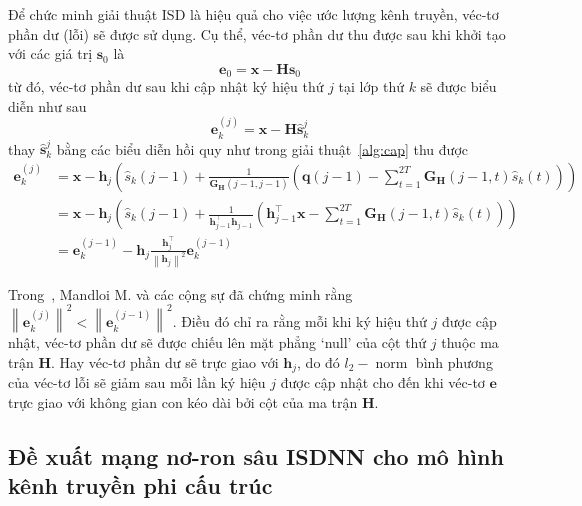 Để chức minh giải thuật ISD là hiệu quả cho việc ước lượng kênh truyền, véc-tơ phần dư (lỗi) sẽ được sử dụng. Cụ thể, véc-tơ phần dư thu được sau khi khởi tạo với các giá trị $\mathbf{s}_0$ là
\begin{equation}
    \mathbf{e}_0 = \mathbf{x} - \mathbf{H} \mathbf{s}_0
\end{equation}
từ đó, véc-tơ phần dư sau khi cập nhật ký hiệu thứ $j$ tại lớp thứ $k$ sẽ được biểu diễn như sau
\begin{equation}
    \mathbf{e}_k^{(j)}=\mathbf{x}-\mathbf{H} \hat{\mathbf{s}}_k^j
\end{equation}
thay $\hat{\mathbf{s}}_k^j$ bằng các biểu diễn hồi quy như trong giải thuật~\ref{alg:cap} thu được
\begin{equation}
\label{eq:eupdate}
\begin{aligned}
    \mathbf{e}_k^{(j)} & =\mathbf{x}-\mathbf{h}_j\left(\hat{s}_k(j-1)+\frac{1}{\mathbf{G}_\mathbf{H}(j-1, j-1)}\left(\mathbf{q}(j-1)-\sum_{t=1}^{2T} \mathbf{G}_\mathbf{H}(j-1, t) \hat{s}_k(t)\right)\right) \\
    & =\mathbf{x}-\mathbf{h}_j\left(\hat{s}_k(j-1)+\frac{1}{\mathbf{h}^\top_{j-1} \mathbf{h}_{j-1}}\left(\mathbf{h}_{j-1}^\top \mathbf{x}-\sum_{t=1}^{2T} \mathbf{G}_\mathbf{H}(j-1, t) \hat{s}_k(t)\right)\right) \\
    & =\mathbf{e}_k^{(j-1)}-\mathbf{h}_{j} \frac{\mathbf{h}_j^\top}{\left\|\mathbf{h}_j\right\|^2} \mathbf{e}_k^{(j-1)}
    \end{aligned}
\end{equation}

Trong~\cite{Mandloi2017}, Mandloi M. và các cộng sự đã chứng minh rằng $\left\|\mathbf{e}_k^{(j)}\right\|^2<\left\|\mathbf{e}_k^{(j-1)}\right\|^2$. Điều đó chỉ ra rằng mỗi khi ký hiệu thứ $j$ được cập nhật, véc-tơ phần dư sẽ được chiếu lên mặt phẳng `null' của cột thứ $j$ thuộc ma trận $\mathbf{H}$. Hay véc-tơ phần dư sẽ trực giao với $\mathbf{h}_j$, do đó $l_2-\operatorname{norm}$ bình phương của véc-tơ lỗi sẽ giảm sau mỗi lần ký hiệu $j$ được cập nhật cho đến khi véc-tơ $\mathbf{e}$ trực giao với không gian con kéo dài bởi cột của ma trận $\mathbf{H}$.

\subsection{Đề xuất mạng nơ-ron sâu ISDNN cho mô hình kênh truyền phi cấu trúc}
\label{sec:ISNN_nonstructured}

